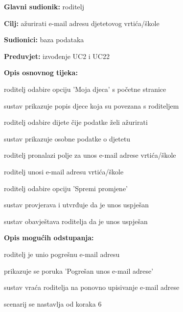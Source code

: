 					\noindent {}
					\begin{packed_item}
	
						\item \textbf{Glavni sudionik: }roditelj
						\item  \textbf{Cilj:} ažurirati e-mail adresu djetetovog vrtića/škole
						\item  \textbf{Sudionici:} baza podataka
						\item  \textbf{Preduvjet:} izvođenje UC2 i UC22
						\item  \textbf{Opis osnovnog tijeka:}
						
						\item[] \begin{packed_enum}
							\item roditelj odabire opciju 'Moja djeca' s početne stranice
							\item sustav prikazuje popis djece koja su povezana s roditeljem
							\item roditelj odabire dijete čije podatke želi ažurirati
							\item sustav prikazuje osobne podatke o djetetu
							\item roditelj pronalazi polje za unos e-mail adrese vrtića/škole
							\item roditelj unosi e-mail adresu vrtića/škole
							\item roditelj odabire opciju 'Spremi promjene'
							\item sustav provjerava i utvrđuje da je unos uspješan
							\item sustav obavještava roditelja da je unos uspješan
			
						\end{packed_enum}
						
						\item  \textbf{Opis mogućih odstupanja:}
						
						\item[] \begin{packed_item}
							\item[8.a] roditelj je unio pogrešnu e-mail adresu 
							\item[] 
							\begin{packed_enum} 
								\item prikazuje se poruka 'Pogrešan unos e-mail adrese'
								\item sustav vraća roditelja na ponovno upisivanje e-mail adrese
								\item scenarij se nastavlja od koraka 6
								
							\end{packed_enum}
						\end{packed_item}
						
					\end{packed_item}


